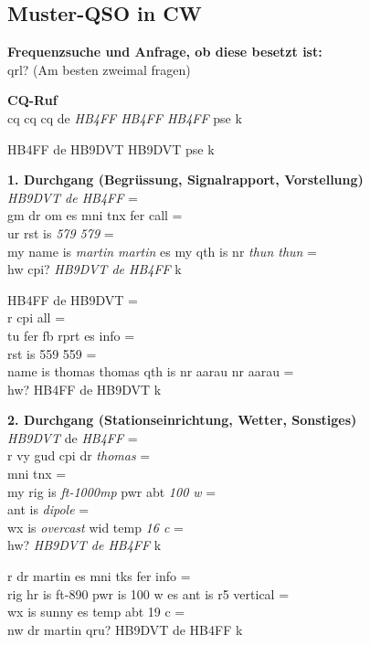 {
\newcommand{\B}[1]{ \hspace*{.4\textwidth }\begin{minipage}{.55\textwidth }#1\end{minipage} }
\newcommand{\T}[1]{\vspace*{1em}

\noindent
\textbf{#1}\\}
\newcommand{\EN}[1]{\textit{#1}}
\newcommand{\gap}[1]{\textcolor{cgap}{\textit{#1}}}

\newpage
\subsection{Muster-QSO in CW}

\textbf{Frequenzsuche und Anfrage, ob diese besetzt ist:}\\
qrl?  (Am besten zweimal fragen)

\T{CQ-Ruf}
cq cq cq de \gap{HB4FF HB4FF HB4FF} pse k\\
\B{HB4FF de HB9DVT HB9DVT  pse k}

\T{1. Durchgang (Begrüssung, Signalrapport, Vorstellung)}
\gap{HB9DVT de HB4FF} =\\
gm dr om es mni tnx fer call =\\
ur rst is \gap{579 579} = \\
my name is \gap{martin martin} es my qth is nr \gap{thun thun} =\\
hw cpi? \gap{HB9DVT de HB4FF} k\\
\B{
HB4FF de HB9DVT =\\
r cpi all =\\
tu fer fb rprt es info =\\
rst is 559 559 =\\
name is thomas thomas qth is nr aarau nr aarau =\\
hw? HB4FF de HB9DVT k
}

\T{2. Durchgang (Stationseinrichtung, Wetter, Sonstiges)}
\gap{HB9DVT} de \gap{HB4FF} =\\
r vy gud cpi dr \gap{thomas} =\\
mni tnx =\\
my rig is \gap{ft-1000mp} pwr abt \gap{100 w} =\\
ant is \gap{dipole} =\\
wx is \gap{overcast} wid temp \gap{16 c} =\\
hw? \gap{HB9DVT de HB4FF} k\\
\B{
r dr martin es mni tks fer info =\\
rig hr is ft-890 pwr is 100 w es ant is r5 vertical =\\
wx is sunny es temp abt 19 c =\\
nw dr martin qru? HB9DVT de HB4FF k
}

}
